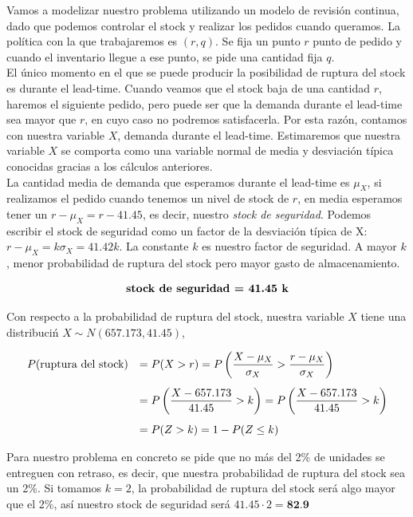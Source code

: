 \documentclass[a4paper,12pt]{article}
\begin{document}
Vamos a modelizar nuestro problema utilizando un modelo de revisi\'on continua, dado que podemos controlar el stock y realizar los pedidos cuando queramos. La pol\'itica con la que trabajaremos es $(r, q)$. Se fija un punto $r$ punto de pedido y cuando el inventario llegue a ese punto, se pide una cantidad fija $q$. \\

El \'unico momento en el que se puede producir la posibilidad de ruptura del stock es durante el lead-time. Cuando veamos que el stock baja de una cantidad $r$, haremos el siguiente pedido, pero puede ser que la demanda durante el lead-time sea mayor que $r$, en cuyo caso no podremos satisfacerla. Por esta raz\'on, contamos con nuestra variable $X$, demanda durante el lead-time. Estimaremos que nuestra variable $X$ se comporta como una variable normal de media y desviaci\'on t\'ipica conocidas gracias a los c\'alculos anteriores.\\

La cantidad media de demanda que esperamos durante el lead-time es $\mu_X$, si realizamos el pedido cuando tenemos un nivel de stock de $r$, en media esperamos tener un $r - \mu_X = r - 41.45$, es decir, nuestro \textit{stock de seguridad}. Podemos escribir el stock de seguridad como un factor de la desviaci\'on t\'ipica de X: $r - \mu_X = k\sigma_X =  41.42 k$. La constante $k$ es nuestro factor de seguridad. A mayor $k$, menor probabilidad de ruptura del stock pero mayor gasto de almacenamiento. 

$$ \textbf{\text{stock de seguridad} = 41.45 k}$$

Con respecto a la probabilidad de ruptura del stock, nuestra variable $X$ tiene una distribuci\'n $ X\sim N(657.173, 41.45)$,

\begin{equation*}
\begin{array}{l l}
 P(\text{ruptura del stock}) & =  P(X > r) = P\left(\dfrac{X - \mu_X}{\sigma_X} > \dfrac{r-\mu_X}{\sigma_X}\right) \\[0.5cm]
 \, &   = P\left(\dfrac{X - 657.173}{41.45} > k\right) = P\left(\dfrac{X - 657.173}{41.45} > k\right) \\[0.5cm]
 \, &   = P(Z > k) = 1 - P(Z \leq k)
\end{array}
\end{equation*}

Para nuestro problema en concreto se pide que no m\'as del 2\% de unidades se entreguen con retraso, es decir, que nuestra probabilidad de ruptura del stock sea un 2\%. Si tomamos $k = 2$, la probabilidad de ruptura del stock ser\'a algo mayor que el 2\%, as\'i nuestro stock de seguridad ser\'a $41.45 \cdot 2 = \textbf{82.9}$
\end{document}
